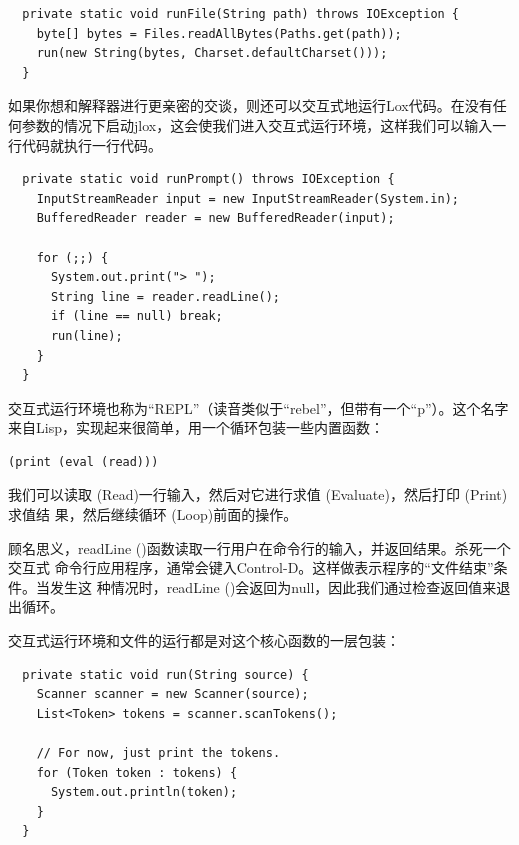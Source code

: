 \documentclass[cn,10pt,math=newtx,citestyle=gb7714-2015,bibstyle=gb7714-2015]{elegantbook}
\newenvironment{code}{\captionsetup{type=listing}}{}
\begin{document}
\begin{code}
\begin{verbatim}
  private static void runFile(String path) throws IOException {
    byte[] bytes = Files.readAllBytes(Paths.get(path));
    run(new String(bytes, Charset.defaultCharset()));
  }
\end{verbatim}
\end{code}

如果你想和解释器进行更亲密的交谈，则还可以交互式地运行Lox代码。在没有任何参数的情况下启动jlox，这会使我们进入交互式运行环境，这样我们可以输入一行代码就执行一行代码。

\begin{code}
\begin{verbatim}
  private static void runPrompt() throws IOException {
    InputStreamReader input = new InputStreamReader(System.in);
    BufferedReader reader = new BufferedReader(input);

    for (;;) { 
      System.out.print("> ");
      String line = reader.readLine();
      if (line == null) break;
      run(line);
    }
  }
\end{verbatim}
\end{code}

\begin{tcolorbox}
交互式运行环境也称为“REPL”（读音类似于“rebel”，但带有一个“p”）。这个名字来自Lisp，实现起来很简单，用一个循环包装一些内置函数：

\begin{verbatim}
(print (eval (read)))
\end{verbatim}

我们可以读取 (Read)一行输入，然后对它进行求值 (Evaluate)，然后打印 (Print)求值结
果，然后继续循环 (Loop)前面的操作。
\end{tcolorbox}

顾名思义，readLine ()函数读取一行用户在命令行的输入，并返回结果。杀死一个交互式
命令行应用程序，通常会键入Control-D。这样做表示程序的“文件结束”条件。当发生这
种情况时，readLine ()会返回为null，因此我们通过检查返回值来退出循环。

交互式运行环境和文件的运行都是对这个核心函数的一层包装：

\begin{code}
\begin{verbatim}
  private static void run(String source) {
    Scanner scanner = new Scanner(source);
    List<Token> tokens = scanner.scanTokens();

    // For now, just print the tokens.
    for (Token token : tokens) {
      System.out.println(token);
    }
  }
\end{verbatim}
\end{code}
\end{document}
